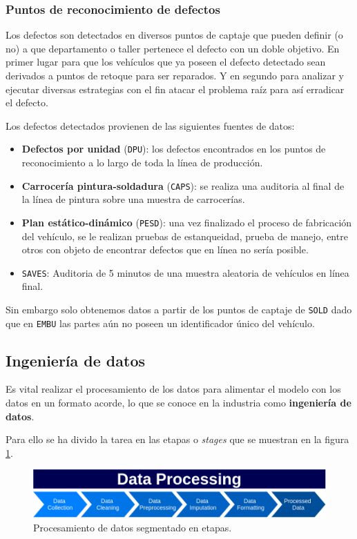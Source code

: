 \documentclass[a4paper,12pt]{article}
\begin{document}
		\subsubsection{Puntos de reconocimiento de defectos} \label{ptocptj}
		Los defectos son detectados en diversos puntos de captaje que pueden definir (o no) a que departamento o taller pertenece el defecto con un doble objetivo. En primer lugar para que los vehículos que ya poseen el defecto detectado sean derivados a puntos de retoque para ser reparados. Y en segundo para analizar y ejecutar diversas estrategias con el fin atacar el problema raíz para así erradicar el defecto.
		
		Los defectos detectados provienen de las siguientes fuentes de datos:
		\begin{itemize}[noitemsep, topsep=2pt]
			\item \textbf{Defectos por unidad} (\texttt{DPU}): los defectos encontrados en los puntos de reconocimiento a lo largo de toda la línea de producción.
			\item \textbf{Carrocería pintura-soldadura} (\texttt{CAPS}): se realiza una auditoria al final de la línea de pintura sobre una muestra de carrocerías.
			\item \textbf{Plan estático-dinámico} (\texttt{PESD}): una vez finalizado el proceso de fabricación del vehículo, se le realizan pruebas de estanqueidad, prueba de manejo, entre otros con objeto de encontrar defectos que en línea no sería posible.
			\item \texttt{SAVES}: Auditoria de 5 minutos de una muestra aleatoria de vehículos en línea final.
		\end{itemize}
		
		Sin embargo solo obtenemos datos a partir de los puntos de captaje de \texttt{SOLD} dado que en \texttt{EMBU} las partes aún no poseen un identificador único del vehículo.
		
		\subsection{Ingeniería de datos}
		Es vital realizar el procesamiento de los datos para alimentar el modelo con los datos en un formato acorde, lo que se conoce en la industria como \textbf{ingeniería de datos}.
		
		Para ello se ha divido la tarea en las etapas o \textit{stages} que se muestran en la figura \ref{fig:dataproc}.
		
		\begin{figure}[H]
			\begin{center}				
				\includegraphics[width=1\textwidth]{dataproc.png}
				\caption{Procesamiento de datos segmentado en etapas.}
				\label{fig:dataproc}
			\end{center}
		\end{figure}
		
\end{document}
